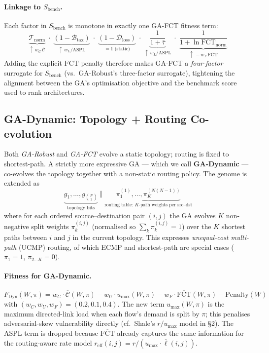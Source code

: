 \documentclass{article}
\begin{document}
    \paragraph{Linkage to $S_{\text{bench}}$.}  Each factor in $S_{\text{bench}}$ is monotone in exactly one GA-FCT fitness term:
    \[
        \underbrace{\mathcal{T}_{\text{norm}}}_{\uparrow\,w_C\,\overline{\mathcal{C}}} \;\cdot\; \underbrace{(1-\mathcal{B}_{\text{tax}})}_{\uparrow\,w_L/\mathrm{ASPL}} \;\cdot\; \underbrace{(1-\mathcal{D}_{\text{loss}})}_{=1\text{ (static)}} \;\cdot\; \underbrace{\frac{1}{1+\bar{\tau}}}_{\uparrow\,w_L/\mathrm{ASPL}} \;\cdot\; \underbrace{\frac{1}{1+\ln\mathrm{FCT}_{\text{norm}}}}_{\uparrow\,-w_F\,\overline{\mathrm{FCT}}}
    \]
    Adding the explicit $\mathrm{FCT}$ penalty therefore makes GA-FCT a \emph{four-factor} surrogate for $S_{\text{bench}}$ (vs.\ GA-Robust's three-factor surrogate), tightening the alignment between the GA's optimisation objective and the benchmark score used to rank architectures.

    \subsection{GA-Dynamic: Topology + Routing Co-evolution}
    \label{sec:ga_dynamic}

    Both \emph{GA-Robust} and \emph{GA-FCT} evolve a static topology; routing is fixed to shortest-path.  A strictly more expressive GA --- which we call \textbf{GA-Dynamic} --- co-evolves the topology together with a non-static routing policy.  The genome is extended as
    \[
        \underbrace{g_1, \ldots, g_{\binom{N}{2}}}_{\text{topology bits}} \;\Vert\; \underbrace{\pi_1^{(1)}, \ldots, \pi_{K}^{(N(N-1))}}_{\text{routing table: $K$-path weights per src--dst}}
    \]
    where for each ordered source--destination pair $(i, j)$ the GA evolves $K$ non-negative split weights $\pi^{(i,j)}_k$ (normalised so $\sum_k \pi^{(i,j)}_k = 1$) over the $K$ shortest paths between $i$ and $j$ in the current topology.  This expresses \emph{unequal-cost multi-path} (UCMP) routing, of which ECMP and shortest-path are special cases ($\pi_1 = 1$, $\pi_{2\ldots K} = 0$).

    \paragraph{Fitness for GA-Dynamic.}
    \begin{equation}
        F_{\text{Dyn}}(W, \pi) = w_C \cdot \overline{\mathcal{C}}(W, \pi) - w_U \cdot u_{\max}(W, \pi) - w_F \cdot \overline{\mathrm{FCT}}(W, \pi) - \mathrm{Penalty}(W)
        \label{eq:ga_dyn_fitness}
    \end{equation}
    with $(w_C, w_U, w_F) = (0.2, 0.1, 0.4)$.  The new term $u_{\max}(W, \pi)$ is the maximum directed-link load when each flow's demand is split by $\pi$; this penalises adversarial-skew vulnerability directly (cf.\ Shale's $r/u_{\max}$ model in \S2).  The ASPL term is dropped because $\overline{\mathrm{FCT}}$ already captures the same information for the routing-aware rate model $r_{\text{eff}}(i,j) = r / (u_{\max} \cdot \overline{\ell}(i,j))$.
\end{document}
